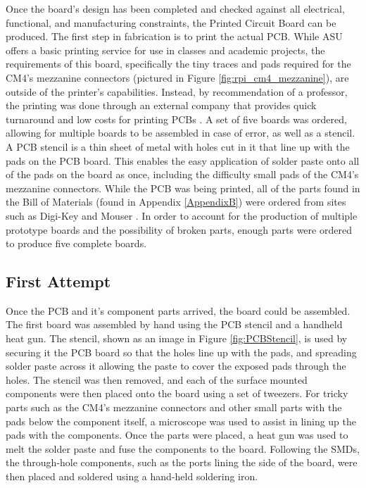 
Once the board's design has been completed and checked against all electrical, functional, and manufacturing constraints, the Printed Circuit Board can be produced.
The first step in fabrication is to print the actual PCB.
While ASU offers a basic printing service for use in classes and academic projects, the requirements of this board, specifically the tiny traces and pads required for the CM4's mezzanine connectors (pictured in Figure \ref{fig:rpi_cm4_mezzanine}), are outside of the printer's capabilities.
Instead, by recommendation of a professor, the printing was done through an external company that provides quick turnaround and low costs for printing PCBs \cite{jlcpcb}.
A set of five boards was ordered, allowing for multiple boards to be assembled in case of error, as well as a stencil.
A PCB stencil is a thin sheet of metal with holes cut in it that line up with the pads on the PCB board.
This enables the easy application of solder paste onto all of the pads on the board as once, including the difficulty small pads of the CM4's mezzanine connectors.
While the PCB was being printed, all of the parts found in the Bill of Materials (found in Appendix \ref{AppendixB}) were ordered from sites such as Digi-Key and Mouser \cite{digikey,mouser}.
In order to account for the production of multiple prototype boards and the possibility of broken parts, enough parts were ordered to produce five complete boards.

\subsection{First Attempt}\label{subsec:Manufacturing1}

Once the PCB and it's component parts arrived, the board could be assembled.
The first board was assembled by hand using the PCB stencil and a handheld heat gun.
The stencil, shown as an image in Figure \ref{fig:PCBStencil}, is used by securing it the PCB board so that the holes line up with the pads, and spreading solder paste across it allowing the paste to cover the exposed pads through the holes.
The stencil was then removed, and each of the surface mounted components were then placed onto the board using a set of tweezers.
For tricky parts such as the CM4's mezzanine connectors and other small parts with the pads below the component itself, a microscope was used to assist in lining up the pads with the components.
Once the parts were placed, a heat gun was used to melt the solder paste and fuse the components to the board.
Following the SMDs, the through-hole components, such as the ports lining the side of the board, were then placed and soldered using a hand-held soldering iron.

